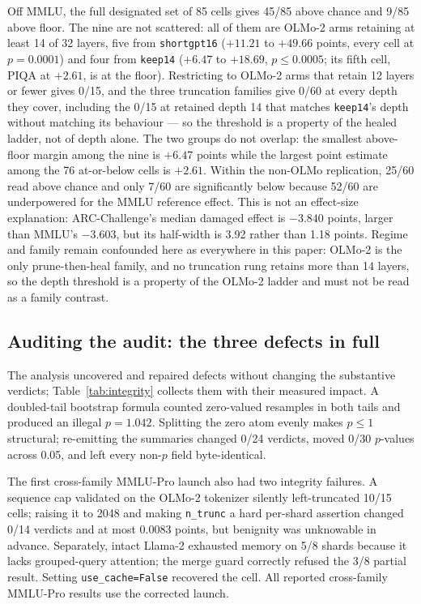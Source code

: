 Off MMLU, the full designated set of 85 cells gives 45/85 above chance and 9/85 above floor. The nine are not scattered: all of them are OLMo-2 arms retaining at least 14 of 32 layers, five from \texttt{shortgpt16} ($+11.21$ to $+49.66$ points, every cell at $p=0.0001$) and four from \texttt{keep14} ($+6.47$ to $+18.69$, $p\leq0.0005$; its fifth cell, PIQA at $+2.61$, is at the floor). Restricting to OLMo-2 arms that retain 12 layers or fewer gives 0/15, and the three truncation families give 0/60 at every depth they cover, including the 0/15 at retained depth 14 that matches \texttt{keep14}'s depth without matching its behaviour --- so the threshold is a property of the healed ladder, not of depth alone. The two groups do not overlap: the smallest above-floor margin among the nine is $+6.47$ points while the largest point estimate among the 76 at-or-below cells is $+2.61$. Within the non-OLMo replication, 25/60 read above chance and only 7/60 are significantly below because 52/60 are underpowered for the MMLU reference effect. This is not an effect-size explanation: ARC-Challenge's median damaged effect is $-3.840$ points, larger than MMLU's $-3.603$, but its half-width is 3.92 rather than 1.18 points. Regime and family remain confounded here as everywhere in this paper: OLMo-2 is the only prune-then-heal family, and no truncation rung retains more than 14 layers, so the depth threshold is a property of the OLMo-2 ladder and must not be read as a family contrast.

\subsection{Auditing the audit: the three defects in full}
\label{app:audit}

The analysis uncovered and repaired defects without changing the substantive verdicts; Table~\ref{tab:integrity} collects them with their measured impact.
A doubled-tail bootstrap formula counted zero-valued resamples in both tails and produced an illegal $p=1.042$. Splitting the zero atom evenly makes $p\leq1$ structural; re-emitting the summaries changed 0/24 verdicts, moved 0/30 $p$-values across 0.05, and left every non-$p$ field byte-identical.

The first cross-family MMLU-Pro launch also had two integrity failures. A sequence cap validated on the OLMo-2 tokenizer silently left-truncated 10/15 cells; raising it to 2048 and making \texttt{n\_trunc} a hard per-shard assertion changed 0/14 verdicts and at most 0.0083 points, but benignity was unknowable in advance. Separately, intact Llama-2 exhausted memory on 5/8 shards because it lacks grouped-query attention; the merge guard correctly refused the 3/8 partial result. Setting \texttt{use\_cache=False} recovered the cell. All reported cross-family MMLU-Pro results use the corrected launch.
